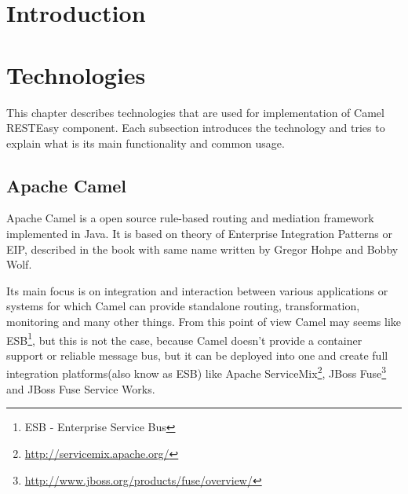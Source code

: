 \documentclass[12pt,final,oneside]{fithesis2}
\begin{document}
\FrontMatter
\ThesisTitlePage

\begin{ThesisDeclaration}
  \DeclarationText
  \AdvisorName
\end{ThesisDeclaration}

\begin{ThesisThanks}
 
\end{ThesisThanks}

\begin{ThesisAbstract}

\end{ThesisAbstract}

\begin{ThesisKeyWords}

\end{ThesisKeyWords}

\MainMatter

\tableofcontents

\chapter{Introduction}


\chapter{Technologies}
This chapter describes technologies that are used for implementation of Camel RESTEasy  component. Each subsection introduces the technology and tries to explain what is its main functionality and common usage.

\section{Apache Camel}
Apache Camel is a open source rule-based routing and mediation framework implemented in Java. It is based on theory of Enterprise Integration Patterns or EIP, described in the book with same name written by Gregor Hohpe and Bobby Wolf\cite{eip}.

Its main focus is on integration and interaction between various applications or systems for which Camel can provide standalone routing, transformation, monitoring and many other things. From this point of view Camel may seems like ESB\footnote{ESB - Enterprise Service Bus}, but this is not the case, because Camel doesn't provide a container support or reliable message bus, but it can be deployed into one and create full integration platforms(also know as ESB) like Apache ServiceMix\footnote{\url{http://servicemix.apache.org/}}, JBoss Fuse\footnote{\url{http://www.jboss.org/products/fuse/overview/}} and JBoss Fuse Service Works. 
\end{document}

